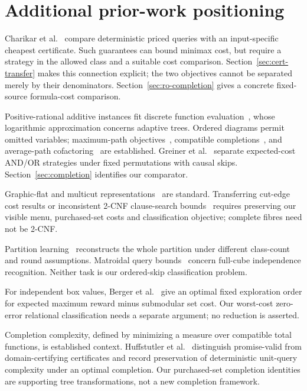 \documentclass[pdflatex,sn-mathphys-num]{sn-jnl}
\theoremstyle{thmstyleone}
\theoremstyle{thmstylethree}
\theoremstyle{thmstyletwo}
\begin{document}



\section{Additional prior-work positioning}\label{app:additional-positioning}
Charikar et al.~\cite{charikar02} compare deterministic priced queries with an input-specific cheapest certificate. Such guarantees can bound minimax cost, but require a strategy in the allowed class and a suitable cost comparison. Section~\ref{sec:cert-transfer} makes this connection explicit; the two objectives cannot be separated merely by their denominators. Section~\ref{sec:ro-completion} gives a concrete fixed-source formula-cost comparison.

Positive-rational additive instances fit discrete function evaluation~\cite{cicalese14}, whose logarithmic approximation concerns adaptive trees. Ordered diagrams permit omitted variables; maximum-path objectives~\cite{ebendt06,ebendt05}, compatible completions~\cite{oliveira,sasao}, and average-path cofactoring~\cite{jiang} are established. Greiner et al.~\cite{greiner} separate expected-cost AND/OR strategies under fixed permutations with causal skips. Section~\ref{sec:completion} identifies our comparator.

Graphic-flat and multicut representations~\cite{berczi,hornakova} are standard. Transferring cut-edge cost results or inconsistent 2-CNF clause-search bounds~\cite{lovasz} requires preserving our visible menu, purchased-set costs and classification objective; complete fibres need not be 2-CNF.

Partition learning~\cite{liu,black} reconstructs the whole partition under different class-count and round assumptions. Matroidal query bounds~\cite{kulkarni} concern full-cube independence recognition. Neither task is our ordered-skip classification problem.

For independent box values, Berger et al.~\cite{pandora} give an optimal fixed exploration order for expected maximum reward minus submodular set cost. Our worst-cost zero-error relational classification needs a separate argument; no reduction is asserted.

Completion complexity, defined by minimizing a measure over compatible total functions, is established context. Huffstutler et al.~\cite{huffstutler2026completion} distinguish promise-valid from domain-certifying certificates and record preservation of deterministic unit-query complexity under an optimal completion. Our purchased-set completion identities are supporting tree transformations, not a new completion framework.
\end{document}
